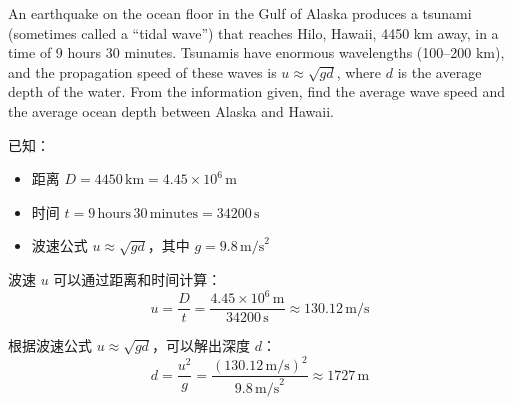 \begin{solution}
    An earthquake on the ocean floor in the Gulf of Alaska produces a tsunami (sometimes called a ``tidal wave'') that reaches Hilo, Hawaii, 4450 km away, in a time of 9 hours 30 minutes. Tsunamis have enormous wavelengths (100--200 km), and the propagation speed of these waves is \( u \approx \sqrt{gd} \), where \( d \) is the average depth of the water. From the information given, find the average wave speed and the average ocean depth between Alaska and Hawaii.

    \tcbrule

	已知：
	\begin{itemize}
		\item 距离 \( D = 4450 \, \text{km} = 4.45 \times 10^6 \, \text{m} \)
		\item 时间 \( t = 9 \, \text{hours} \, 30 \, \text{minutes} = 34200 \, \text{s} \)
		\item 波速公式 \( u \approx \sqrt{gd} \)，其中 \( g = 9.8 \, \text{m/s}^2 \)
	\end{itemize}

	波速 \( u \) 可以通过距离和时间计算：
	\[
	u = \frac{D}{t} = \frac{4.45 \times 10^6 \, \text{m}}{34200 \, \text{s}} \approx 130.12 \, \text{m/s}
	\]

	根据波速公式 \( u \approx \sqrt{gd} \)，可以解出深度 \( d \)：
	\[
	d = \frac{u^2}{g} = \frac{(130.12 \, \text{m/s})^2}{9.8 \, \text{m/s}^2} \approx 1727 \, \text{m}
	\]

\end{solution}

